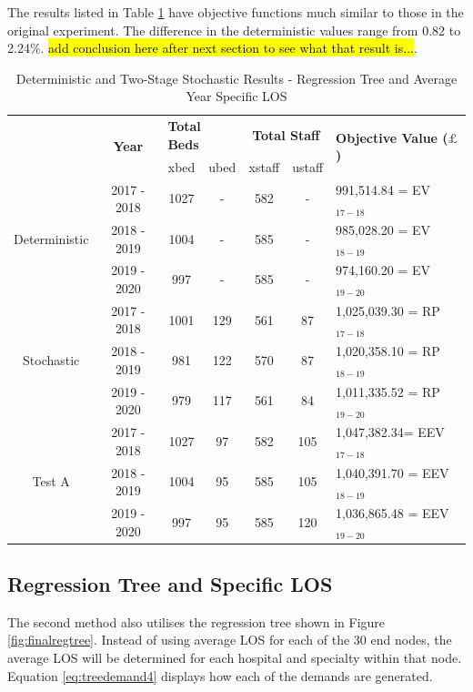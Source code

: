 \documentclass[../thesis.tex]{subfiles}
\begin{document}
The results listed in Table \ref{tab:Results3} have objective functions much similar to those in the original experiment. The difference in the deterministic values range from 0.82 to 2.24\%. \hl{add conclusion here after next section to see what that result is...}. 

\begin{table}[h!]
    \centering
    \begin{tabular}{ccccccl}\toprule
 & \multirow{2}{*}{\textbf{Year}}& \multicolumn{2}{l}{\textbf{Total Beds}} & \multicolumn{2}{c}{\textbf{Total Staff}} & \multirow{2}{*}{\textbf{Objective Value ($\pounds$)}}\\ \cmidrule(lr){3-4} \cmidrule(lr){5-6}
&& xbed           & ubed          & xstaff         & ustaff         \\ \midrule
     \multirow{3}{*}{Deterministic} & 2017 - 2018 & 1027   & - &  582 & - & 991,514.84 =  EV$_{17-18}$ \\ 
      & 2018 - 2019 & 1004 & - &585 &  - &  985,028.20 =  EV$_{18-19}$ \\
      & 2019 - 2020 & 997 & - & 585 & - &   974,160.20 =  EV$_{19-20}$\\ \midrule
     \multirow{3}{*}{Stochastic} & 2017 - 2018 & 1001  & 129  & 561 & 87 & 1,025,039.30  =  RP$_{17-18}$ \\ 
      & 2018 - 2019 & 981 & 122  & 570 & 87 & 1,020,358.10 =  RP$_{18-19}$ \\
      & 2019 - 2020 & 979 & 117 & 561 & 84 & 1,011,335.52 =  RP$_{19-20}$\\ \midrule    
     \multirow{3}{*}{Test A} & 2017 - 2018 & 1027  & 97 &  582 & 105 & 1,047,382.34=  EEV$_{17-18}$ \\ 
      & 2018 - 2019& 1004 & 95 & 585 & 105 &1,040,391.70 =  EEV$_{18-19}$ \\
      & 2019 - 2020 & 997 & 95 & 585  & 120 & 1,036,865.48 =  EEV$_{19-20}$\\ \bottomrule       
    \end{tabular}
    \caption{Deterministic and Two-Stage Stochastic Results - Regression Tree and Average Year Specific LOS}
    \label{tab:Results3}
\end{table}




\subsection{Regression Tree and Specific LOS}
The second method also utilises the regression tree shown in Figure \ref{fig:finalregtree}. Instead of using average LOS for each of the 30 end nodes, the average LOS will be determined for each hospital and specialty within that node. Equation \eqref{eq:treedemand4} displays how each of the demands are generated.
\end{document}
